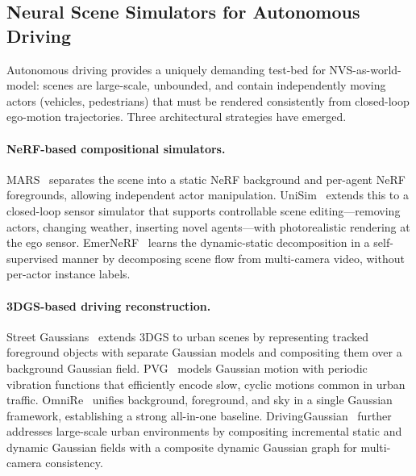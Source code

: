\subsection{Neural Scene Simulators for Autonomous Driving}

Autonomous driving provides a uniquely demanding test-bed for NVS-as-world-model:
scenes are large-scale, unbounded, and contain independently moving actors
(vehicles, pedestrians) that must be rendered consistently from closed-loop
ego-motion trajectories.
Three architectural strategies have emerged.

\paragraph{NeRF-based compositional simulators.}
MARS~\citep{wu2023mars} separates the scene into a static NeRF background
and per-agent NeRF foregrounds, allowing independent actor manipulation.
UniSim~\citep{yang2023unisim} extends this to a closed-loop sensor simulator
that supports controllable scene editing---removing actors, changing weather,
inserting novel agents---with photorealistic rendering at the ego sensor.
EmerNeRF~\citep{yang2023emernerf} learns the dynamic-static decomposition
in a self-supervised manner by decomposing scene flow from multi-camera video,
without per-actor instance labels.

\paragraph{3DGS-based driving reconstruction.}
Street Gaussians~\citep{yan2024streetgaussian} extends 3DGS to urban scenes
by representing tracked foreground objects with separate Gaussian models and
compositing them over a background Gaussian field.
PVG~\citep{chen2023pvg} models Gaussian motion with periodic vibration functions
that efficiently encode slow, cyclic motions common in urban traffic.
OmniRe~\citep{chen2024omnire} unifies background, foreground, and sky in a
single Gaussian framework, establishing a strong all-in-one baseline.
DrivingGaussian~\citep{wang2024drivinggaussian} further addresses large-scale
urban environments by compositing incremental static and dynamic Gaussian fields
with a composite dynamic Gaussian graph for multi-camera consistency.

